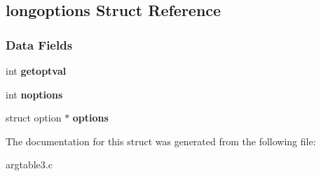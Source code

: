 \hypertarget{structlongoptions}{}\subsection{longoptions Struct Reference}
\label{structlongoptions}
\subsubsection*{Data Fields}
\begin{DoxyCompactItemize}
\item 
\mbox{\label{structlongoptions_a1d31b55286d2873387df42ccbe1f57d6}} 
int {\bfseries getoptval}
\item 
\mbox{\label{structlongoptions_a130bedca5ada10b0e6650436a0755943}} 
int {\bfseries noptions}
\item 
\mbox{\label{structlongoptions_acdc24725b8ee1ee2ea263d19c4467b7a}} 
struct option $\ast$ {\bfseries options}
\end{DoxyCompactItemize}


The documentation for this struct was generated from the following file\+:\begin{DoxyCompactItemize}
\item 
argtable3.\+c\end{DoxyCompactItemize}
